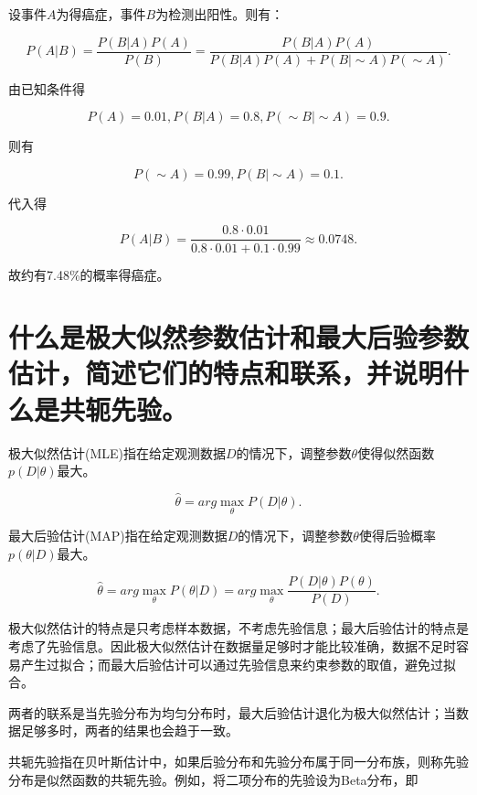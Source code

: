\documentclass{article}
\begin{document}
设事件$A$为得癌症，事件$B$为检测出阳性。则有：

\begin{equation}
    P(A|B)=\frac{P(B|A)P(A)}{P(B)}=\frac{P(B|A)P(A)}{P(B|A)P(A)+P(B|\sim A)P(\sim A)}.
\end{equation}

由已知条件得

\begin{equation}
    P(A)=0.01, P(B|A)=0.8, P(\sim B|\sim A)=0.9.
\end{equation}

则有

\begin{equation}
    P(\sim A)=0.99, P(B|\sim A)=0.1.
\end{equation}

代入得

\begin{equation}
    P(A|B)=\frac{0.8\cdot 0.01}{0.8\cdot 0.01+0.1\cdot 0.99}\approx 0.0748.
\end{equation}

故约有7.48\%的概率得癌症。

\section{什么是极大似然参数估计和最大后验参数估计，简述它们的特点和联系，并说明什么是共轭先验。}

极大似然估计(MLE)指在给定观测数据$D$的情况下，调整参数$\theta$使得似然函数$p(D|\theta)$最大。

\begin{equation}
    \hat{\theta}=arg\max_{\theta}P(D|\theta).
\end{equation}

最大后验估计(MAP)指在给定观测数据$D$的情况下，调整参数$\theta$使得后验概率$p(\theta|D)$最大。

\begin{equation}
    \hat{\theta}=arg\max_{\theta}P(\theta|D)=arg\max_{\theta}\frac{P(D|\theta)P(\theta)}{P(D)}.
\end{equation}

极大似然估计的特点是只考虑样本数据，不考虑先验信息；最大后验估计的特点是考虑了先验信息。因此极大似然估计在数据量足够时才能比较准确，数据不足时容易产生过拟合；而最大后验估计可以通过先验信息来约束参数的取值，避免过拟合。

两者的联系是当先验分布为均匀分布时，最大后验估计退化为极大似然估计；当数据足够多时，两者的结果也会趋于一致。

共轭先验指在贝叶斯估计中，如果后验分布和先验分布属于同一分布族，则称先验分布是似然函数的共轭先验。例如，将二项分布的先验设为Beta分布，即
\end{document}
